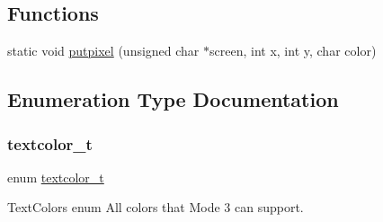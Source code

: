 \subsection*{Functions}
\begin{DoxyCompactItemize}
\item 
static void \hyperlink{a00044_aff86a3b09d2ef03cc5bf1af73bd19e0f_aff86a3b09d2ef03cc5bf1af73bd19e0f}{putpixel} (unsigned char $\ast$screen, int x, int y, char color)
\end{DoxyCompactItemize}


\subsection{Enumeration Type Documentation}
\mbox{\label{a00044_a69d534d923d28a9c06b33b5a2a83bf9e_a69d534d923d28a9c06b33b5a2a83bf9e}} 
\subsubsection{\texorpdfstring{textcolor\+\_\+t}{textcolor\_t}}
{\footnotesize\ttfamily enum \hyperlink{a00044_a69d534d923d28a9c06b33b5a2a83bf9e_a69d534d923d28a9c06b33b5a2a83bf9e}{textcolor\+\_\+t}}



Text\+Colors enum All colors that Mode 3 can support. 

